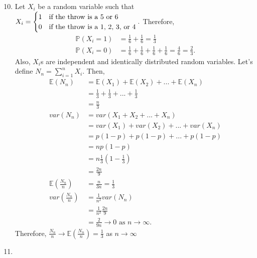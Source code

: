 \documentclass{article}
\begin{document}
\begin{enumerate}
    \setcounter{enumi}{9}
    \item 
    
    Let $X_i$ be a random variable such that $X_i=\begin{cases}
    1 & \text{if the throw is a $5$ or $6$}\crcr
    0 & \text{if the throw is a $1$, $2$, $3$, or $4$}
    \end{cases}.$ Therefore,
    \begin{align*}
        \mathbb{P}(X_i=1)&=\frac{1}{6}+\frac{1}{6}=\frac{1}{3}\\
        \mathbb{P}(X_i=0)&=\frac{1}{6}+\frac{1}{6}+\frac{1}{6}+\frac{1}{6}=\frac{4}{6}=\frac{2}{3}.
    \end{align*} Also, $X_i$s are independent and identically distributed random variables. Let's define $N_n=\sum_{i=1}^nX_i$. Then,
    \begin{align*}
        \mathbb{E}(N_n) &= \mathbb{E}(X_1)+\mathbb{E}(X_2)+...+\mathbb{E}(X_n)\\
        &= \frac{1}{3}+\frac{1}{3}+...+\frac{1}{3}\\
        &= \frac{n}{3}\\
        var(N_n) &= var(X_1+X_2+...+X_n)\\
        &= var(X_1)+var(X_2)+...+var(X_n)\\
        &= p(1-p)+p(1-p)+...+p(1-p)\\
        &= np(1-p)\\
        &= n\frac{1}{3}(1-\frac{1}{3})\\
        &= \frac{2n}{9}\\
        \mathbb{E}(\frac{N_n}{n}) &= \frac{n}{3n}=\frac{1}{3}\\
        var(\frac{N_n}{n}) &= \frac{1}{n^2}var(N_n)\\
        &= \frac{1}{n^2}\frac{2n}{9}\\
        &= \frac{2}{9n} \rightarrow 0 \text{ as $n\rightarrow\infty$}.
    \end{align*} Therefore, $\frac{N_n}{n}\rightarrow \mathbb{E}(\frac{N_n}{n})=\frac{1}{3}$ as $n\rightarrow \infty$
    
    \setcounter{enumi}{20}
    \item
    

\end{enumerate}
\end{document}

